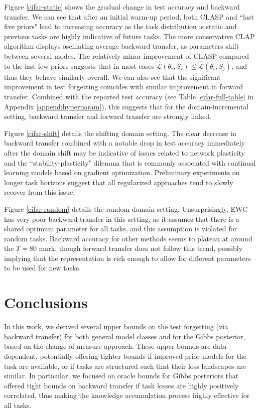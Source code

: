 \documentclass{article}
\theoremstyle{plain}
\theoremstyle{definition}
\theoremstyle{remark}
\begin{document}
Figure \ref{cifar-static} shows the gradual change in test accuracy and backward transfer.
We can see that after an initial warm-up period, both CLASP and ``last five priors" lead to increasing accuracy as the task distribution is static and previous tasks are highly indicative of future tasks. The more conservative CLAP algorithm displays oscillating average backward transfer, as parameters shift between several modes. The relatively minor improvement of CLASP compared to the last few priors suggests that in most cases $\hat{\mathcal{L}}(\theta_i, S_i)\leq \hat{\mathcal{L}}(\theta_i, S_j)$, and thus they behave similarly overall.
We can also see that the significant improvement in test forgetting coincides with similar improvement in forward transfer. Combined with the reported test accuracy (see Table \ref{cifar-full-table} in Appendix \ref{append:hyperparam}), this suggests that for the domain-incremental setting, backward transfer and forward transfer are strongly linked.%

Figure \ref{cifar-shift} details the shifting domain setting. The clear decrease in backward transfer combined with a notable drop in test accuracy immediately after the domain shift may be indicative of issues related to network plasticity and the ``stability-plasticity" dilemma \citep{mirzadeh2020understanding} that is commonly associated with continual learning models based on gradient optimization. Preliminary experiments on longer task horizons suggest that all regularized approaches tend to slowly recover from this issue.

Figure \ref{cifar-random} details the random domain setting. Unsurprisingly, EWC has very poor backward transfer in this setting, as it assumes that there is a shared optimum parameter for all tasks, and this assumption is violated for random tasks. Backward accuracy for other methods seems to plateau at around the $T=80$ mark, though forward transfer does not follow this trend, possibly implying that the representation is rich enough to allow for different parameters to be used for new tasks.

\section{Conclusions} %

In this work, we derived several upper bounds on the test forgetting (via backward transfer) for both general model classes and for the Gibbs posterior, based on the change of measure approach.
These upper bounds are data-dependent, potentially offering tighter bounds if improved prior models for the task are available, or if tasks are structured such that their loss landscapes are similar. In particular, we focused on oracle bounds for Gibbs posteriors that offered tight bounds on backward transfer if task losses are highly positively correlated, thus making the knowledge accumulation process highly effective for all tasks.
\end{document}
